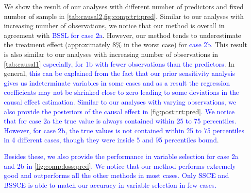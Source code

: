 \documentclass[preprint,12pt]{elsarticle}
\newcommand{\added}[1]{\textcolor{blue}{#1}}
\begin{document}
We show the result of our analyses with different number of predictors and
fixed number of sample in \cref{tab:causal2,fig:comp:trt:pred}. Similar to
our analyses with increasing number of observations, we notice that our method 
is overall in agreement with
\added{BSSL for case 2a}. However, our method tends to
underestimate the treatment effect (approximately 8\% in the worst case) for \added{case 2b}. 
This result is also similar to our
analyses with increasing number of observations in \cref{tab:causal1}
\added{especially, for 1b with fewer observations than the predictors}.
In general, \added{this can be explained from the fact that our prior sensitivity analysis gives us indeterminate variables in some cases and as a result the regression coefficients may not be shrinked close to zero leading to some deviations in the causal effect estimation. Similar to our analyses with varying observations, we also provide the posteriors of the causal effect in \cref{fig:post:trt:pred}. We notice that for case 2a the true value is always contained within 25 to 75 percentiles. However, for case 2b, the true values is not contained within 25 to 75 percentiles in 4 different cases, though they were inside 5 and 95 percentiles bound}. 

\added{Besides these, we also provide the performance in variable selection for case 2a and 2b in \cref{fig:comp:loss:pred}. We notice that our method performs extremely good and outperforms all the other methods in most cases. Only SSCE and BSSCE is able to match our accuracy in variable selection in few cases. }
\end{document}
